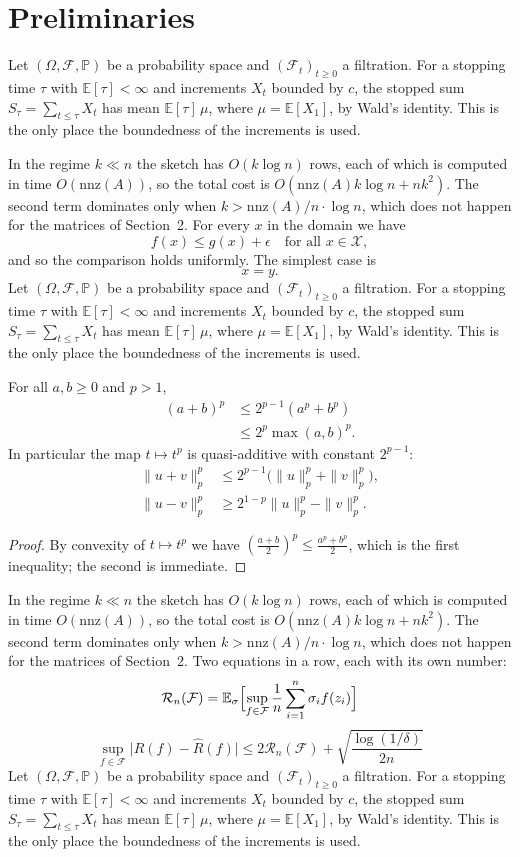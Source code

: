 \newcommand{\proseD}{Let $(\Omega, \mathcal{F}, \mathbb{P})$ be a probability space and $(\mathcal{F}_t)_{t \geq 0}$ a filtration. For a stopping time $\tau$ with $\mathbb{E}[\tau] < \infty$ and increments $X_t$ bounded by $c$, the stopped sum $S_\tau = \sum_{t \le \tau} X_t$ has mean $\mathbb{E}[\tau]\,\mu$, where $\mu = \mathbb{E}[X_1]$, by Wald's identity. This is the only place the boundedness of the increments is used.}
\newcommand{\proseE}{In the regime $k \ll n$ the sketch has $O(k \log n)$ rows, each of which is computed in time $O(\mathrm{nnz}(A))$, so the total cost is $O(\mathrm{nnz}(A) k \log n + n k^2)$. The second term dominates only when $k > \mathrm{nnz}(A)/n \cdot \log n$, which does not happen for the matrices of Section~2.}

\section{Preliminaries}
\proseD

\proseE
For every $x$ in the domain we have
\[
f(x) \le g(x) + \epsilon \quad \text{for all } x \in \mathcal{X},
\]
and so the comparison holds uniformly. The simplest case is
\[
x = y.
\]
\proseD

\begin{lemma}\label{lem:split}
For all $a, b \geq 0$ and $p > 1$,
\begin{equation}\label{eq:split}
\begin{split}
(a+b)^p &\le 2^{p-1}(a^p + b^p) \\
&\le 2^{p}\max(a,b)^p.
\end{split}
\end{equation}
In particular the map $t \mapsto t^p$ is quasi-additive with constant $2^{p-1}$:
\begin{align*}
\|u + v\|_p^p &\le 2^{p-1}\bigl(\|u\|_p^p + \|v\|_p^p\bigr), \\
\|u - v\|_p^p &\ge 2^{1-p}\|u\|_p^p - \|v\|_p^p.
\end{align*}
\end{lemma}

\begin{proof}
By convexity of $t \mapsto t^p$ we have $\left(\frac{a+b}{2}\right)^p \le \frac{a^p + b^p}{2}$, which is the first inequality; the second is immediate.
\end{proof}

\proseE
Two equations in a row, each with its own number:
\begin{equation}\label{eq:first}
\mathcal{R}_n(\mathcal{F}) = \mathbb{E}_\sigma \Bigl[\sup_{f \in \mathcal{F}} \frac{1}{n}\sum_{i=1}^n \sigma_i f(z_i)\Bigr]
\end{equation}
\begin{equation}\label{eq:second}
\sup_{f \in \mathcal{F}} \bigl|R(f) - \widehat{R}(f)\bigr| \le 2\mathcal{R}_n(\mathcal{F}) + \sqrt{\frac{\log(1/\delta)}{2n}}
\end{equation}
\proseD

